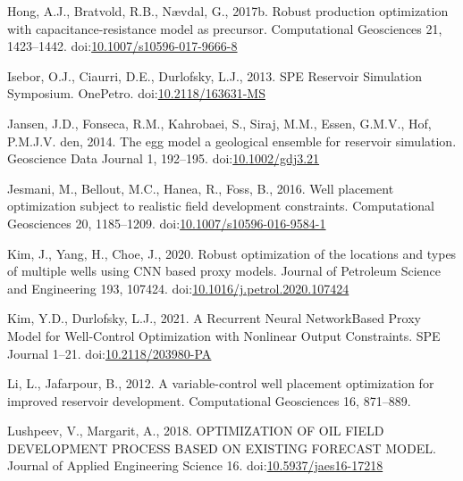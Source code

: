 \documentclass[]{elsarticle} %
\newlength{\cslhangindent}
\newenvironment{CSLReferences}[2] %
 {%
  \setlength{\parindent}{0pt}
  \ifodd #1 \everypar{\setlength{\hangindent}{\cslhangindent}}\ignorespaces\fi
  \ifnum #2 > 0
  \setlength{\parskip}{#2\baselineskip}
  \fi
 }%
 {}
\begin{document}
\begin{CSLReferences}{1}{0}
\leavevmode{}%
Hong, A.J., Bratvold, R.B., Nævdal, G., 2017b. Robust production optimization with capacitance-resistance model as precursor. Computational Geosciences 21, 1423--1442. doi:\href{https://doi.org/10.1007/s10596-017-9666-8}{10.1007/s10596-017-9666-8}

\leavevmode{}%
Isebor, O.J., Ciaurri, D.E., Durlofsky, L.J., 2013. SPE Reservoir Simulation Symposium. OnePetro. doi:\href{https://doi.org/10.2118/163631-MS}{10.2118/163631-MS}

\leavevmode{}%
Jansen, J.D., Fonseca, R.M., Kahrobaei, S., Siraj, M.M., Essen, G.M.V., Hof, P.M.J.V. den, 2014. The egg model {\textendash} a geological ensemble for reservoir simulation. Geoscience Data Journal 1, 192--195. doi:\href{https://doi.org/10.1002/gdj3.21}{10.1002/gdj3.21}

\leavevmode{}%
Jesmani, M., Bellout, M.C., Hanea, R., Foss, B., 2016. Well placement optimization subject to realistic field development constraints. Computational Geosciences 20, 1185--1209. doi:\href{https://doi.org/10.1007/s10596-016-9584-1}{10.1007/s10596-016-9584-1}

\leavevmode{}%
Kim, J., Yang, H., Choe, J., 2020. Robust optimization of the locations and types of multiple wells using CNN based proxy models. Journal of Petroleum Science and Engineering 193, 107424. doi:\href{https://doi.org/10.1016/j.petrol.2020.107424}{10.1016/j.petrol.2020.107424}

\leavevmode{}%
Kim, Y.D., Durlofsky, L.J., 2021. A Recurrent Neural Network{\textendash}Based Proxy Model for Well-Control Optimization with Nonlinear Output Constraints. SPE Journal 1--21. doi:\href{https://doi.org/10.2118/203980-PA}{10.2118/203980-PA}

\leavevmode{}%
Li, L., Jafarpour, B., 2012. A variable-control well placement optimization for improved reservoir development. Computational Geosciences 16, 871--889.

\leavevmode{}%
Lushpeev, V., Margarit, A., 2018. OPTIMIZATION OF OIL FIELD DEVELOPMENT PROCESS BASED ON EXISTING FORECAST MODEL. Journal of Applied Engineering Science 16. doi:\href{https://doi.org/10.5937/jaes16-17218}{10.5937/jaes16-17218}


\end{CSLReferences}
\end{document}

